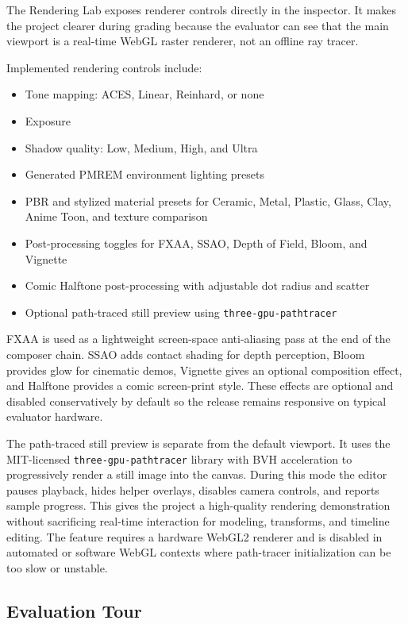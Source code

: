 \documentclass[12pt,a4paper]{article}
\begin{document}
The Rendering Lab exposes renderer controls directly in the inspector. It makes
the project clearer during grading because the evaluator can see that the main
viewport is a real-time WebGL raster renderer, not an offline ray tracer.

Implemented rendering controls include:
\begin{itemize}
  \item Tone mapping: ACES, Linear, Reinhard, or none
  \item Exposure
  \item Shadow quality: Low, Medium, High, and Ultra
  \item Generated PMREM environment lighting presets
  \item PBR and stylized material presets for Ceramic, Metal, Plastic, Glass,
  Clay, Anime Toon, and texture comparison
  \item Post-processing toggles for FXAA, SSAO, Depth of Field, Bloom, and
  Vignette
  \item Comic Halftone post-processing with adjustable dot radius and scatter
  \item Optional path-traced still preview using \texttt{three-gpu-pathtracer}
\end{itemize}

FXAA is used as a lightweight screen-space anti-aliasing pass at the end of the
composer chain. SSAO adds contact shading for depth perception, Bloom provides
glow for cinematic demos, Vignette gives an optional composition effect, and
Halftone provides a comic screen-print style. These effects are optional and
disabled conservatively by default so the release remains responsive on typical
evaluator hardware.

The path-traced still preview is separate from the default viewport. It uses the
MIT-licensed \texttt{three-gpu-pathtracer} library with BVH acceleration to
progressively render a still image into the canvas. During this mode the editor
pauses playback, hides helper overlays, disables camera controls, and reports
sample progress. This gives the project a high-quality rendering demonstration
without sacrificing real-time interaction for modeling, transforms, and timeline
editing. The feature requires a hardware WebGL2 renderer and is disabled in
automated or software WebGL contexts where path-tracer initialization can be too
slow or unstable.

\subsection{Evaluation Tour}
\end{document}
